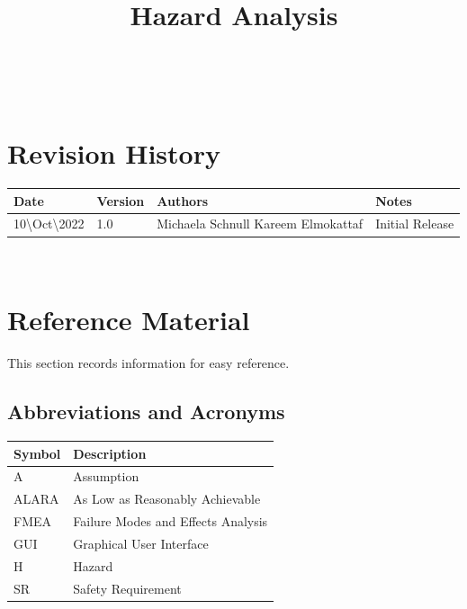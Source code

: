 \documentclass[12pt]{article}
\title{Hazard Analysis\\\progname}
\author{\authname}
\date{}
\begin{document}

\maketitle

\newpage

\tableofcontents
\listoffigures
\listoftables

~\newpage

\section*{Revision History}

\begin{tabularx}{1.0\textwidth}{p{3cm}p{2cm}p{4cm}X}
\toprule {\bf Date} & {\bf Version} & {\bf Authors} & {\bf Notes}\\
\midrule
10\textbackslash Oct\textbackslash 2022 & 1.0 & Michaela Schnull \newline Kareem Elmokattaf  & Initial Release\\
\bottomrule
\end{tabularx}

~\newpage

\section{Reference Material}

This section records information for easy reference.

\subsection{Abbreviations and Acronyms}

\renewcommand{\arraystretch}{1.2}
\begin{tabular}{l l} 
  \toprule		
  \textbf{Symbol} & \textbf{Description}\\
  \midrule 
  A & Assumption\\
  ALARA & As Low as Reasonably Achievable\\
  FMEA & Failure Modes and Effects Analysis\\
  GUI & Graphical User Interface\\
  H & Hazard\\
  SR & Safety Requirement\\
  \bottomrule
\end{tabular}\\
\end{document}
